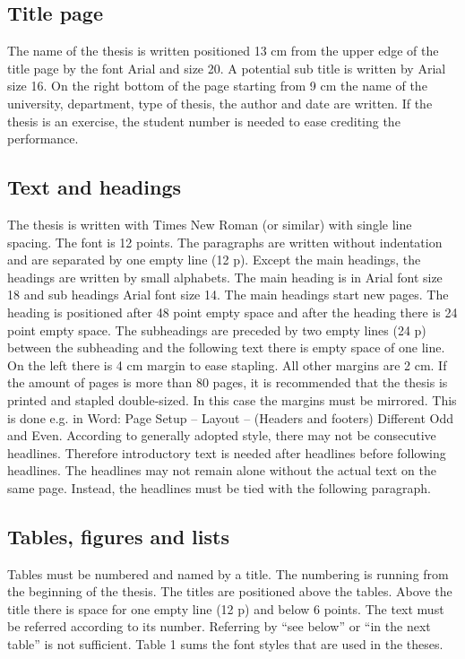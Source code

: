 \documentclass[a4paper,12pt]{article}
\begin{document}
\subsection{Title page}
The name of the thesis is written positioned 13 cm from the upper edge of the title page by the font Arial and size 20. A potential sub title is written by Arial size 16. On the right bottom of the page starting from 9 cm the name of the university, department, type of thesis, the author and date are written. If the thesis is an exercise, the student number is needed to ease crediting the performance. 
\subsection{Text and headings}
The thesis is written with Times New Roman (or similar) with single line spacing. The font is 12 points. The paragraphs are written without indentation and are separated by one empty line (12 p). Except the main headings, the headings are written by small alphabets. The main heading is in Arial font size 18 and sub headings Arial font size 14. The main headings start new pages. The heading is positioned after 48 point empty space and after the heading there is 24 point empty space. The subheadings are preceded by two empty lines (24 p) between the subheading and the following text there is empty space of one line.
On the left there is 4 cm margin to ease stapling. All other margins are 2 cm. If the amount of pages is more than 80 pages, it is recommended that the thesis is printed and stapled double-sized. In this case the margins must be mirrored. This is done e.g. in Word: Page Setup – Layout – (Headers and footers) Different Odd and Even.
According to generally adopted style, there may not be consecutive headlines. Therefore introductory text is needed after headlines before following headlines. The headlines may not remain alone without the actual text on the same page. Instead, the headlines must be tied with the following paragraph.
\subsection{Tables, figures and lists}
Tables must be numbered and named by a title. The numbering is running from the beginning of the thesis. The titles are positioned above the tables. Above the title there is space for one empty line (12 p) and below 6 points. The text must be referred according to its number. Referring by “see below” or “in the next table” is not sufficient. Table 1 sums the font styles that are used in the theses.
\end{document}
